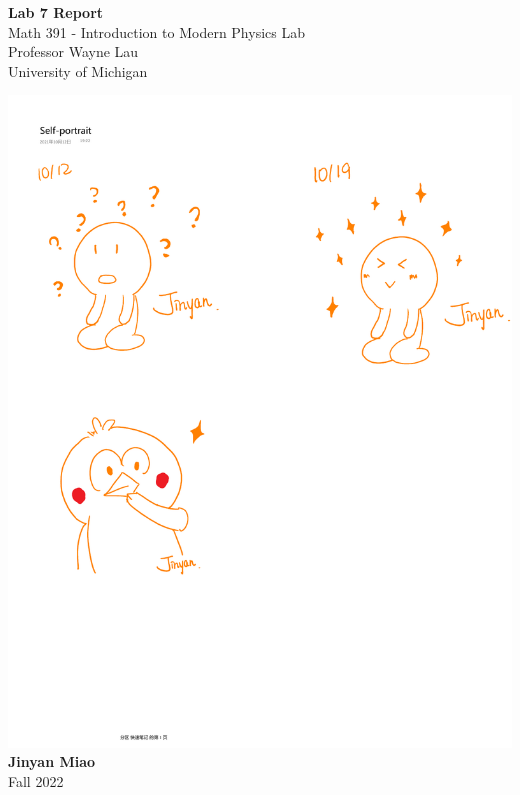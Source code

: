 \documentclass[11pt]{book}
\theoremstyle{break}
\theoremstyle{break}
\begin{document}
	\begin{titlepage}
		\begin{center}
			\vspace*{1cm}
			\Huge \color{red}
				\textbf{Lab 7 Report}\\
			\vspace{0.5cm}			
			\Large \color{black}
				Math 391 - Introduction to Modern Physics Lab\\
				Professor Wayne Lau\\	
				University of Michigan\\
			\vspace{3cm}

			\includegraphics[scale=1]{hmm.pdf}\\
			
			
			\vspace{5cm}
			\LARGE
				\textbf{Jinyan Miao}\\
				\hfill\break
				\LARGE Fall 2022\\
			\vspace{1cm}

		\vspace*{\fill}
		\end{center}			
	\end{titlepage}
\end{document}
